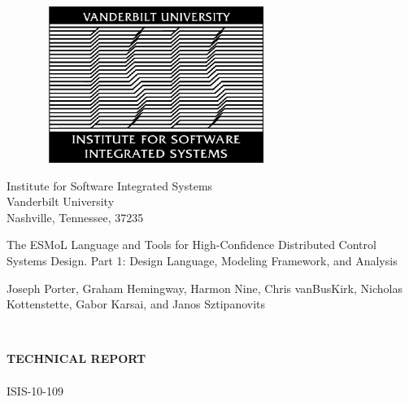 \begin{figure}[!htp]
\label{fig:ISIS} \vspace{1cm}
\begin{center}
\includegraphics[width=3in,height=2in]{figures/isis_old.png}
\end{center}
\vspace{.0cm}
\end{figure}

\begin{center}\begin{Large}
Institute for Software Integrated Systems \\
Vanderbilt University \\
Nashville, Tennessee, 37235 \\
\end{Large}\end{center}

\vspace{1cm}

\begin{LARGE}
\begin{center}
The ESMoL Language and Tools for High-Confidence Distributed Control Systems Design.  Part 1: Design Language, Modeling Framework, and Analysis \\
\vspace{.75cm}
\begin{Large}
Joseph Porter, Graham Hemingway, Harmon Nine, Chris vanBusKirk, Nicholas Kottenstette, Gabor Karsai, and Janos Sztipanovits
\end{Large}\\
\end{center}
\end{LARGE}

\vspace{2cm}

\begin{Large}
\begin{center}
\textbf{TECHNICAL REPORT} \\
\ \\
ISIS-10-109
\end{center}
\end{Large}

\newpage
